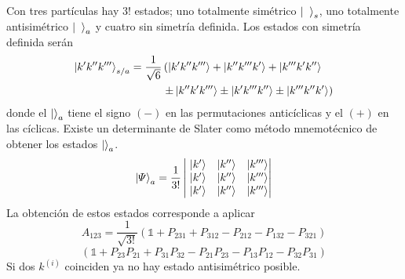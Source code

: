 \documentclass[10pt,oneside]{CBFT_book}
\begin{document}
Con tres partículas hay $3!$ estados; uno totalmente simétrico $\Ket{\phantom{k}}_s$, uno totalmente antisimétrico 
$\Ket{\phantom{k}}_a$ y cuatro sin simetría definida.
Los estados con simetría definida serán 
\begin{align*}
	\Ket{k'k''k'''}_{s/a} = \frac{1}{\sqrt{6}}&\left( \Ket{k'k''k'''} +  \Ket{k''k'''k'} + \Ket{k'''k'k''}\right. \\
	& \left. \pm \Ket{k''k'k'''} \pm \Ket{k'k'''k''} \pm \Ket{k'''k''k'} \right)
\end{align*}
donde el $\Ket{}_a$ tiene el signo $(-)$ en las permutaciones anticíclicas y el $(+)$ en las cíclicas.
Existe un determinante de Slater como método mnemotécnico de obtener los estados $\Ket{}_a$.
\[
	\Ket{ \Psi }_a = \frac{1}{3!}\begin{vmatrix} \; \Ket{k'} & \Ket{k''} & \Ket{k'''} \\  
	\; \Ket{k'} & \Ket{k''} & \Ket{k'''} \\ \; \Ket{k'} & \Ket{k''} & \Ket{k'''} \end{vmatrix}
\]
La obtención de estos estados corresponde a aplicar 
\[
	A_{123} = \frac{1}{\sqrt{3!}}\left( \mathbb{1} + P_{231} + P_{312} - P_{212} - P_{132} - P_{321} \right)
\]
\[
	( \mathbb{1} + P_{23}P_{21} + P_{31}P_{32} - P_{21}P_{23} - P_{13}P_{12} - P_{32}P_{31} )
\]
Si dos $k^{(i)}$ coinciden ya no hay estado antisimétrico posible.
\end{document}

